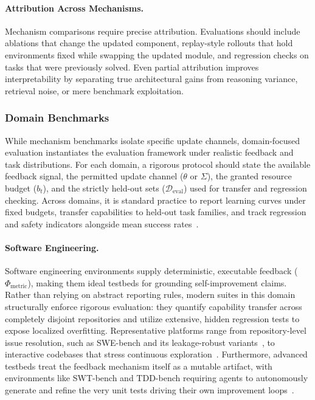 \documentclass{article}
\begin{document}
\paragraph{Attribution Across Mechanisms.}
Mechanism comparisons require precise attribution. Evaluations should include ablations that change the updated component, replay-style rollouts that hold environments fixed while swapping the updated module, and regression checks on tasks that were previously solved. Even partial attribution  improves interpretability by separating true architectural gains from reasoning variance, retrieval noise, or mere benchmark exploitation.


\subsubsection{Domain Benchmarks}
\label{sec:Domain_Benchmarks}
While mechanism benchmarks isolate specific update channels, domain-focused  evaluation instantiates the evaluation framework under realistic feedback and task distributions. For each domain, a rigorous protocol should state the available feedback signal, the permitted update channel ($\theta$ or $\Sigma$), the granted resource budget ($b_t$), and the strictly held-out sets ($\mathcal{D}_{\text{eval}}$) used for transfer and regression checking. Across domains, it is standard practice to report learning curves under fixed budgets, transfer capabilities to held-out task families, and track regression and safety indicators alongside mean success rates~\citep{xi2024agentgym, levy2025stwebagentbenchbenchmarkevaluatingsafety, yin2025safeagentbenchbenchmarksafetask}.

\paragraph{Software Engineering.}
Software engineering environments  supply deterministic, executable feedback ($\Phi_{\text{metric}}$), making them ideal testbeds for grounding self-improvement claims. Rather than relying on abstract reporting rules, modern suites in this domain structurally enforce rigorous evaluation: they quantify capability transfer across completely disjoint repositories and utilize extensive, hidden regression tests to expose localized overfitting. Representative platforms range from repository-level issue resolution, such as SWE-bench and its leakage-robust variants~\citep{jimenez2024swebenchlanguagemodelsresolve, aleithan2024swebenchenhancedcodingbenchmark}, to interactive codebases that stress continuous exploration~\citep{qiu2025locobenchagentinteractivebenchmarkllm}. Furthermore, advanced testbeds treat the feedback mechanism itself as a mutable artifact, with environments like SWT-bench and TDD-bench requiring agents to autonomously generate and refine the very unit tests driving their own improvement loops~\citep{mündler2025swtbenchtestingvalidatingrealworld, ahmed2024tddbenchverifiedllmsgenerate}.
\end{document}
